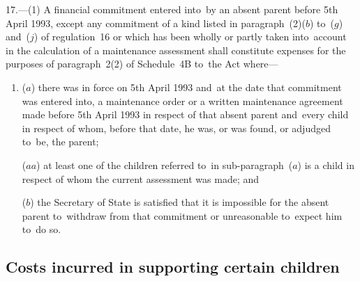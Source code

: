 \documentclass[12pt,a4paper]{article}
\begin{document}
17.—(1) A financial commitment entered into~by an absent parent before 5th April 1993, except any commitment of a kind listed in paragraph~(2)($b$) to~($g$) and~($j$) of regulation~16 or which has been wholly or partly taken into~account in the calculation of a maintenance assessment shall constitute expenses for the purposes of paragraph~2(2) of Schedule~4B to~the Act where—
\begin{enumerate}\item[]
($a$) there was in force on 5th April 1993 and~at the date that commitment was entered into, 
a maintenance order or a written  %
maintenance agreement made before 5th April 1993 in respect of that absent parent and~every child in respect of whom, before that date, he was, or was found, or adjudged to~be, the parent; 

($aa$) at least one of the children referred to~in sub-paragraph~($a$) is a child in respect of whom the current assessment was made; and

($b$) the Secretary of State is satisfied that it is impossible for the absent
parent to~withdraw from that commitment or unreasonable to~expect him to~do so.
\end{enumerate}

%


\subsection[18. Costs incurred in supporting certain children]{Costs incurred in supporting certain children}
\end{document}
